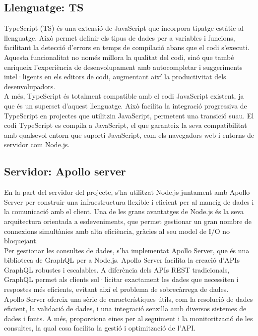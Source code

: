 \documentclass[a4paper,12pt,twoside]{ThesisStyle}
\begin{document}
\subsection{Llenguatge: TS}
\label{subsec:Llenguatge: TS}

TypeScript (TS) és una extensió de JavaScript que incorpora tipatge estàtic al llenguatge. Això permet definir els tipus de dades per a variables i funcions, facilitant la detecció d'errors en temps de compilació abans que el codi s'executi. Aquesta funcionalitat no només millora la qualitat del codi, sinó que també enriqueix l'experiència de desenvolupament amb autocompletar i suggeriments intel·ligents en els editors de codi, augmentant així la productivitat dels desenvolupadors.\\

A més, TypeScript és totalment compatible amb el codi JavaScript existent, ja que és un superset d’aquest llenguatge. Això facilita la integració progressiva de TypeScript en projectes que utilitzin JavaScript, permetent una transició suau. El codi TypeScript es compila a JavaScript, el que garanteix la seva compatibilitat amb qualsevol entorn que suporti JavaScript, com els navegadors web i entorns de servidor com Node.js.



\subsection{Servidor: Apollo server}
\label{subsec:Servidor: Apollo server}

En la part del servidor del projecte, s'ha utilitzat Node.js juntament amb Apollo Server per construir una infraestructura flexible i eficient per al maneig de dades i la comunicació amb el client. Una de les grans avantatges de Node.js és la seva arquitectura orientada a esdeveniments, que permet gestionar un gran nombre de connexions simultànies amb alta eficiència, gràcies al seu model de I/O no bloquejant.\\

Per gestionar les consultes de dades, s'ha implementat Apollo Server, que és una biblioteca de GraphQL per a Node.js. Apollo Server facilita la creació d'APIs GraphQL robustes i escalables. A diferència dels APIs REST tradicionals, GraphQL permet als clients sol·licitar exactament les dades que necessiten i respostes més eficients, evitant així el problema de sobrecàrrega de dades.\\

Apollo Server ofereix una sèrie de característiques útils, com la resolució de dades eficient, la validació de dades, i una integració senzilla amb diversos sistemes de dades i fonts. A més, proporciona eines per al seguiment i la monitorització de les consultes, la qual cosa facilita la gestió i optimització de l'API.\\
\end{document}

